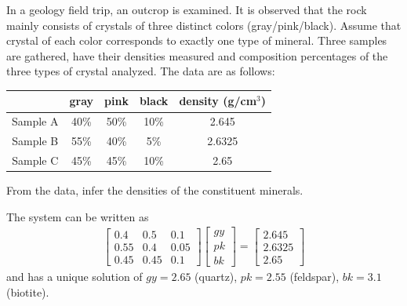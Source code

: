 \begin{Exercise}
In a geology field trip, an outcrop is examined. It is observed that the rock mainly consists of crystals of three distinct colors (gray/pink/black). Assume that crystal of each color corresponds to exactly one type of mineral. Three samples are gathered, have their densities measured and composition percentages of the three types of crystal analyzed. The data are as follows:
\begin{center}
\begin{tabular}{|c|c|c|c|c|}
\hline
 & gray & pink & black & density (g/cm$^3$) \\
\hline
Sample A & 40\% & 50\% & 10\% & 2.645\\
\hline
Sample B & 55\% & 40\% & 5\% & 2.6325\\
\hline
Sample C & 45\% & 45\% & 10\% & 2.65\\
\hline
\end{tabular}
\end{center}
From the data, infer the densities of the constituent minerals.
\end{Exercise}
\begin{Answer}
The system can be written as
\begin{align*}
\begin{bmatrix}
0.4 & 0.5 & 0.1 \\
0.55 & 0.4 & 0.05 \\
0.45 & 0.45 & 0.1
\end{bmatrix}
\begin{bmatrix}
gy \\
pk \\
bk
\end{bmatrix}
=
\begin{bmatrix}
2.645 \\
2.6325 \\
2.65
\end{bmatrix}
\end{align*}
and has a unique solution of $gy = 2.65$ (quartz), $pk = 2.55$ (feldspar), $bk = 3.1$ (biotite).
\end{Answer}

